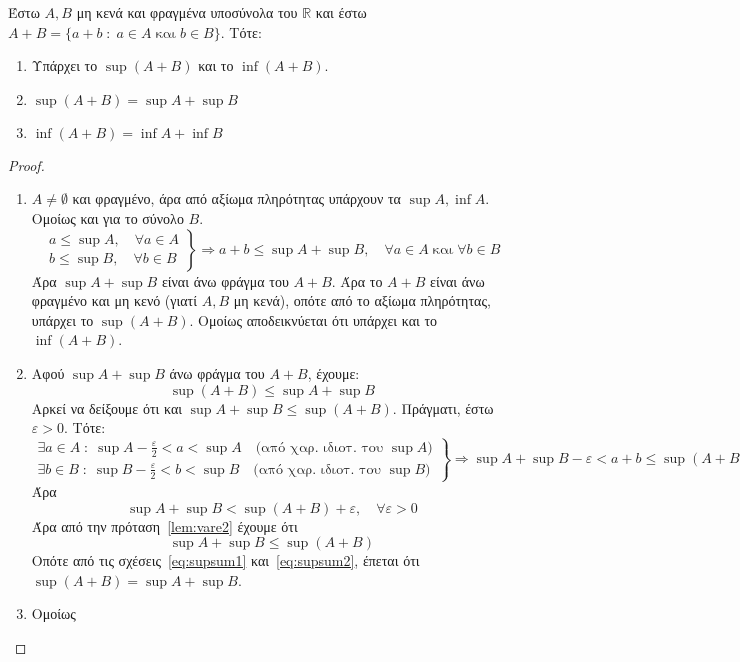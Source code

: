 \documentclass[main.tex]{subfiles}
\begin{document}
\begin{mypropbox}
  Έστω $ A,B $ μη κενά και φραγμένα υποσύνολα του $ \mathbb{R} $ και έστω 
  $ A+B= \{ a+b \; : \; a \in A \; \text{και} \; b \in B \} $.
  Τότε:
  \begin{enumerate}
    \item Υπάρχει το $ \sup (A+B) $ και το $ \inf (A+B) $.
    \item $ \sup {(A+B)}= \sup A + \sup B $
    \item $ \inf {(A+B)}= \inf A + \inf B $
  \end{enumerate}
\end{mypropbox}
\begin{proof}
\item {}
  \begin{enumerate}
    \item $ A \neq \emptyset $ και φραγμένο, άρα από αξίωμα πληρότητας υπάρχουν τα 
      $ \sup A, \inf A $. Ομοίως και για το σύνολο $B$.
      \[
        \left.
          \begin{aligned}
            a \leq \sup A, \quad \forall a \in A \\
            b \leq \sup B, \quad \forall b \in B 
          \end{aligned}
        \right\} \Rightarrow a+b \leq \sup A + \sup B, \quad \forall a \in A 
        \; \text{και} \; \forall b \in B
      \]
      Άρα $ \sup A + \sup B $ είναι άνω φράγμα του $ A+B $. Άρα το $ A+B $ είναι 
      άνω φραγμένο και μη κενό (γιατί $A,B$ μη κενά), οπότε από το αξίωμα πληρότητας, 
      υπάρχει το $ \sup {(A+B)} $. Ομοίως αποδεικνύεται ότι υπάρχει και το 
      $ \inf {(A+B)} $. 
    \item Αφού $ \sup A + \sup B $ άνω φράγμα του $ A+B $, έχουμε:
      \begin{equation}\label{eq:supsum1}
        \sup {(A+B)} \leq \sup A + \sup B 
      \end{equation} 
      Αρκεί να δείξουμε ότι και $ \sup A + \sup B \leq \sup {(A+B)} $. Πράγματι, έστω 
      $ \varepsilon > 0 $. Τότε:
      \[
        \left.
          \begin{aligned} 
            \exists a \in A \; : \; \sup A - \frac{\varepsilon}{2} < a < \sup A 
            \quad \text{(από χαρ. ιδιοτ. του $\sup A$)} \\
            \exists b \in B \; : \; \sup B - \frac{\varepsilon}{2} < b < \sup B 
            \quad \text{(από χαρ. ιδιοτ. του $\sup B$)} 
          \end{aligned} 
        \right\} \Rightarrow \sup A + \sup B - \varepsilon < a+b \leq \sup {(A+B)} 
      \] 
      Άρα 
      \[
        \sup A + \sup B < \sup {(A+B)} + \varepsilon , \quad \forall \varepsilon >0
      \] 
      Άρα από την πρόταση~\ref{lem:vare2} έχουμε ότι 
      \begin{equation}\label{eq:supsum2}
        \sup A + \sup B \leq \sup {(A+B)}
      \end{equation}
      Οπότε από τις σχέσεις~\eqref{eq:supsum1} και~\eqref{eq:supsum2}, έπεται ότι 
      $ \sup {(A+B)} = \sup A + \sup B $. 
    \item Ομοίως
  \end{enumerate}
\end{proof}
\end{document}
